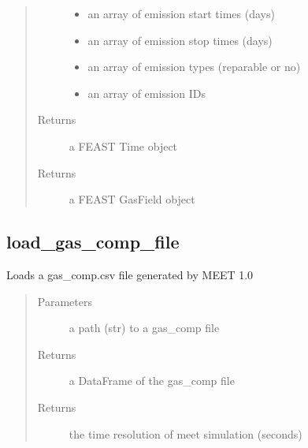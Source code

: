 \documentclass[letterpaper,10pt,english]{sphinxmanual}
\begin{document}
\begin{fulllineitems}
\begin{quote}
\begin{description}
\begin{itemize}
\item {} 
 \textendash{} an array of emission start times (days)

\item {} 
 \textendash{} an array of emission stop times (days)

\item {} 
 \textendash{} an array of emission types (reparable or no)

\item {} 
 \textendash{} an array of emission IDs

\end{itemize}

\item[{Returns}] \leavevmode
a FEAST Time object

\item[{Returns}] \leavevmode
a FEAST GasField object

\end{description}\end{quote}

\end{fulllineitems}



\subsection{load\_gas\_comp\_file}
\label{\detokenize{index:load-gas-comp-file}}

\begin{fulllineitems}
\label{\detokenize{index:feast.MEET_1_importer.load_gas_comp_file}}
Loads a gas\_comp.csv file generated by MEET 1.0
\begin{quote}\begin{description}
\item[{Parameters}] \leavevmode
{} \textendash{} a path (str) to a gas\_comp file

\item[{Returns}] \leavevmode
a DataFrame of the gas\_comp file

\item[{Returns}] \leavevmode
the time resolution of meet simulation (seconds)

\end{description}\end{quote}

\end{fulllineitems}
\end{document}
